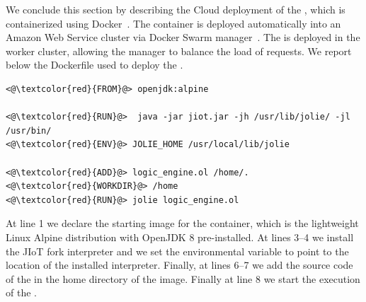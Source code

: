 We conclude this section by describing the Cloud deployment of the
, which is containerized using
Docker~\cite{Merkel:2014:DLL:2600239.2600241}. The container is deployed
automatically into an Amazon Web Service cluster via Docker Swarm
manager~\cite{Soppelsa:2017:NDC:3153103}. The  is deployed in
the worker cluster, allowing the manager to balance the load of requests. We
report below the Dockerfile used to deploy the .
%
\begin{lstlisting}
<@\textcolor{red}{FROM}@> openjdk:alpine

<@\textcolor{red}{RUN}@>  java -jar jiot.jar -jh /usr/lib/jolie/ -jl /usr/bin/
<@\textcolor{red}{ENV}@> JOLIE_HOME /usr/local/lib/jolie

<@\textcolor{red}{ADD}@> logic_engine.ol /home/.
<@\textcolor{red}{WORKDIR}@> /home
<@\textcolor{red}{RUN}@> jolie logic_engine.ol
\end{lstlisting}
%
At line 1 we declare the starting image for the container, which is the
lightweight Linux Alpine distribution with OpenJDK 8 pre-installed. At lines
3--4 we install the JIoT fork interpreter and we set the environmental
variable  to point to the location of the installed interpreter. Finally, at lines 6--7 we add the source code of the
 in the home directory of the image.
Finally at line 8 we start the execution of the .

